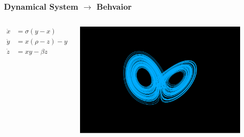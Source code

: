 \documentclass[aspectratio=169]{beamer}
\begin{document}
\begin{frame}
\frametitle{Dynamical System $\to$ Behvaior}

\begin{columns}
		\[\begin{split}
			\dot x &= \sigma(y - x) \\
			\dot y &= x(\rho - z) - y \\
			\dot z &= xy - \beta z
		\end{split} \]
	\resizebox{1.5cm}{!}{$\longrightarrow$}
	\begin{center}
		\includegraphics[width=0.95\textwidth, trim={4cm, 1.5cm, 4cm, 3cm}, clip]{Examples/slide3_lorenz_attractor.pdf}
	\end{center}
\end{columns}
\end{frame}
\end{document}
